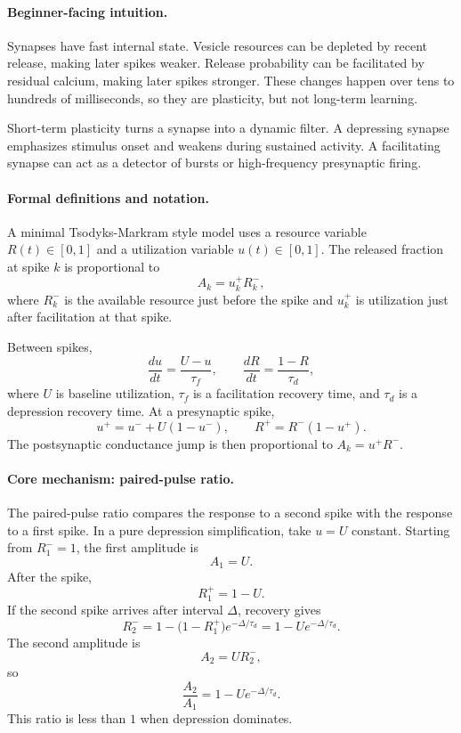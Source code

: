 \paragraph{Beginner-facing intuition.}
Synapses have fast internal state. Vesicle resources can be depleted by recent release, making later spikes weaker. Release probability can be facilitated by residual calcium, making later spikes stronger. These changes happen over tens to hundreds of milliseconds, so they are plasticity, but not long-term learning.

Short-term plasticity turns a synapse into a dynamic filter. A depressing synapse emphasizes stimulus onset and weakens during sustained activity. A facilitating synapse can act as a detector of bursts or high-frequency presynaptic firing.

\paragraph{Formal definitions and notation.}
A minimal Tsodyks-Markram style model uses a resource variable \(R(t)\in[0,1]\) and a utilization variable \(u(t)\in[0,1]\). The released fraction at spike \(k\) is proportional to
\[
A_k=u_k^+ R_k^-,
\]
where \(R_k^-\) is the available resource just before the spike and \(u_k^+\) is utilization just after facilitation at that spike.

Between spikes,
\[
\frac{du}{dt}=\frac{U-u}{\tau_f},
\qquad
\frac{dR}{dt}=\frac{1-R}{\tau_d},
\]
where \(U\) is baseline utilization, \(\tau_f\) is a facilitation recovery time, and \(\tau_d\) is a depression recovery time. At a presynaptic spike,
\[
u^+=u^-+U(1-u^-),
\qquad
R^+=R^-(1-u^+).
\]
The postsynaptic conductance jump is then proportional to \(A_k=u^+R^-\).

\paragraph{Core mechanism: paired-pulse ratio.}
The paired-pulse ratio compares the response to a second spike with the response to a first spike. In a pure depression simplification, take \(u=U\) constant. Starting from \(R_1^-=1\), the first amplitude is
\[
A_1=U.
\]
After the spike,
\[
R_1^+=1-U.
\]
If the second spike arrives after interval \(\Delta\), recovery gives
\[
R_2^-=1-\bigl(1-R_1^+\bigr)e^{-\Delta/\tau_d}
=1-Ue^{-\Delta/\tau_d}.
\]
The second amplitude is
\[
A_2=U R_2^-,
\]
so
\[
\boxed{\frac{A_2}{A_1}=1-Ue^{-\Delta/\tau_d}.}
\]
This ratio is less than \(1\) when depression dominates.

